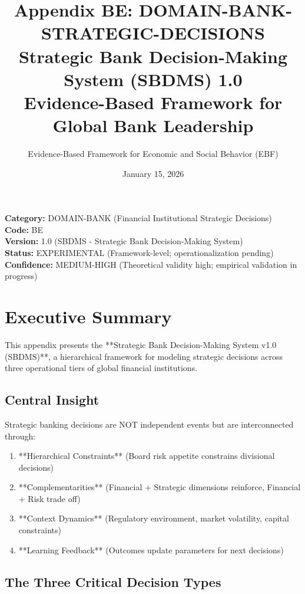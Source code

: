 \documentclass[11pt]{article}
\title{\textbf{Appendix BE: DOMAIN-BANK-STRATEGIC-DECISIONS} \\ Strategic Bank Decision-Making System (SBDMS) 1.0 \\ Evidence-Based Framework for Global Bank Leadership}
\author{Evidence-Based Framework for Economic and Social Behavior (EBF)}
\date{January 15, 2026}
\begin{document}
\maketitle

\begin{center}
\colorbox{lightcyan!30}{\begin{minipage}{0.95\textwidth}
\textbf{Category:} DOMAIN-BANK (Financial Institutional Strategic Decisions) \\
\textbf{Code:} BE \\
\textbf{Version:} 1.0 (SBDMS - Strategic Bank Decision-Making System) \\
\textbf{Status:} EXPERIMENTAL (Framework-level; operationalization pending) \\
\textbf{Confidence:} MEDIUM-HIGH (Theoretical validity high; empirical validation in progress)
\end{minipage}}
\end{center}

\section{Executive Summary}

This appendix presents the **Strategic Bank Decision-Making System v1.0 (SBDMS)**, a hierarchical framework for modeling strategic decisions across three operational tiers of global financial institutions.

\subsection{Central Insight}

Strategic banking decisions are NOT independent events but are interconnected through:
\begin{enumerate}
\item **Hierarchical Constraints** (Board risk appetite constrains divisional decisions)
\item **Complementarities** (Financial + Strategic dimensions reinforce, Financial + Risk trade off)
\item **Context Dynamics** (Regulatory environment, market volatility, capital constraints)
\item **Learning Feedback** (Outcomes update parameters for next decisions)
\end{enumerate}

\subsection{The Three Critical Decision Types}
\end{document}
